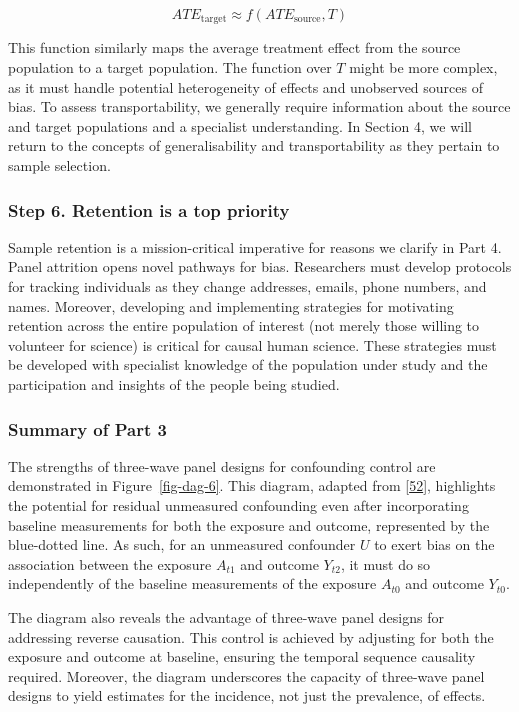 \documentclass[
  singlecolumn]{article}
\begin{document}
\[ATE_{\text{target}} \approx f(ATE_{\text{source}}, T)\]

This function similarly maps the average treatment effect from the
source population to a target population. The function over \(T\) might
be more complex, as it must handle potential heterogeneity of effects
and unobserved sources of bias. To assess transportability, we generally
require information about the source and target populations and a
specialist understanding. In Section 4, we will return to the concepts
of generalisability and transportability as they pertain to sample
selection.

\hypertarget{step-6.-retention-is-a-top-priority}{%
\subsubsection{Step 6. Retention is a top
priority}\label{step-6.-retention-is-a-top-priority}}

Sample retention is a mission-critical imperative for reasons we clarify
in Part 4. Panel attrition opens novel pathways for bias. Researchers
must develop protocols for tracking individuals as they change
addresses, emails, phone numbers, and names. Moreover, developing and
implementing strategies for motivating retention across the entire
population of interest (not merely those willing to volunteer for
science) is critical for causal human science. These strategies must be
developed with specialist knowledge of the population under study and
the participation and insights of the people being studied.

\hypertarget{summary-of-part-3}{%
\subsubsection{Summary of Part 3}\label{summary-of-part-3}}

The strengths of three-wave panel designs for confounding control are
demonstrated in Figure~\ref{fig-dag-6}. This diagram, adapted from
{[}\protect\hyperlink{ref-vanderweele2020}{52}{]}, highlights the
potential for residual unmeasured confounding even after incorporating
baseline measurements for both the exposure and outcome, represented by
the blue-dotted line. As such, for an unmeasured confounder \(U\) to
exert bias on the association between the exposure \(A_{t1}\) and
outcome \(Y_{t2}\), it must do so independently of the baseline
measurements of the exposure \(A_{t0}\) and outcome \(Y_{t0}\).

The diagram also reveals the advantage of three-wave panel designs for
addressing reverse causation. This control is achieved by adjusting for
both the exposure and outcome at baseline, ensuring the temporal
sequence causality required. Moreover, the diagram underscores the
capacity of three-wave panel designs to yield estimates for the
incidence, not just the prevalence, of effects.
\end{document}
